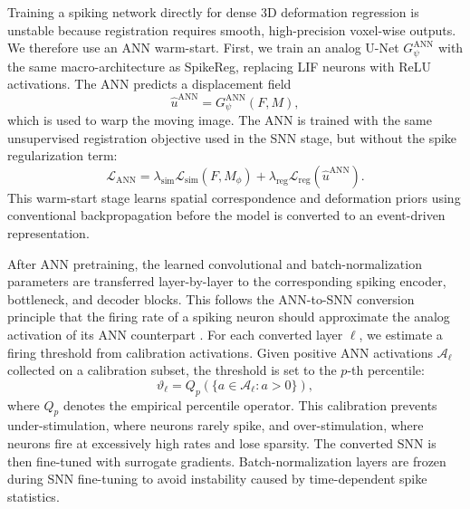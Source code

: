 
Training a spiking network directly for dense 3D deformation regression is unstable because registration requires smooth, high-precision voxel-wise outputs. We therefore use an ANN warm-start. First, we train an analog U-Net $G_{\psi}^{\mathrm{ANN}}$ with the same macro-architecture as SpikeReg, replacing LIF neurons with ReLU activations. The ANN predicts a displacement field
\begin{equation}
    \hat{u}^{\mathrm{ANN}} = G_{\psi}^{\mathrm{ANN}}(F,M),
\end{equation}
which is used to warp the moving image. The ANN is trained with the same unsupervised registration objective used in the SNN stage, but without the spike regularization term:
\begin{equation}
    \mathcal{L}_{\mathrm{ANN}}
    =
    \lambda_{\mathrm{sim}}\mathcal{L}_{\mathrm{sim}}(F,M_{\phi})
    +
    \lambda_{\mathrm{reg}}\mathcal{L}_{\mathrm{reg}}(\hat{u}^{\mathrm{ANN}}).
\end{equation}
This warm-start stage learns spatial correspondence and deformation priors using conventional backpropagation before the model is converted to an event-driven representation.


After ANN pretraining, the learned convolutional and batch-normalization parameters are transferred layer-by-layer to the corresponding spiking encoder, bottleneck, and decoder blocks. This follows the ANN-to-SNN conversion principle that the firing rate of a spiking neuron should approximate the analog activation of its ANN counterpart \citep{diehl2015fast,rueckauer2017conversion}. For each converted layer $\ell$, we estimate a firing threshold from calibration activations. Given positive ANN activations $\mathcal{A}_{\ell}$ collected on a calibration subset, the threshold is set to the $p$-th percentile:
\begin{equation}
    \vartheta_{\ell}
    =
    Q_{p}\left(\{a \in \mathcal{A}_{\ell}: a > 0\}\right),
\end{equation}
where $Q_{p}$ denotes the empirical percentile operator. This calibration prevents under-stimulation, where neurons rarely spike, and over-stimulation, where neurons fire at excessively high rates and lose sparsity. The converted SNN is then fine-tuned with surrogate gradients. Batch-normalization layers are frozen during SNN fine-tuning to avoid instability caused by time-dependent spike statistics.

